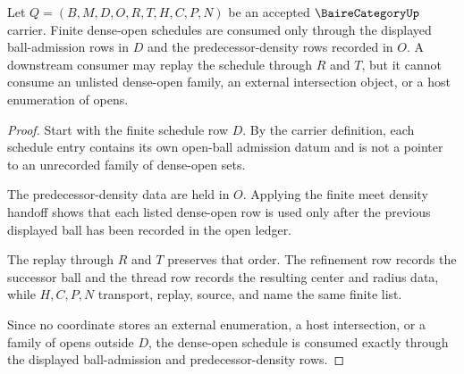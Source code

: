 \begin{theorem}
\label{thm:baire-category-dense-open-schedule-scope}
Let $Q=(B,M,D,O,R,T,H,C,P,N)$ be an accepted $\BaireCategoryUp$ carrier. Finite dense-open schedules are consumed only through the displayed ball-admission rows in $D$ and the predecessor-density rows recorded in $O$. A downstream consumer may replay the schedule through $R$ and $T$, but it cannot consume an unlisted dense-open family, an external intersection object, or a host enumeration of opens.
\end{theorem}
\begin{proof}
Start with the finite schedule row $D$. By the carrier definition, each schedule entry contains its own open-ball admission datum and is not a pointer to an unrecorded family of dense-open sets.

The predecessor-density data are held in $O$. Applying the finite meet density handoff shows that each listed dense-open row is used only after the previous displayed ball has been recorded in the open ledger.

The replay through $R$ and $T$ preserves that order. The refinement row records the successor ball and the thread row records the resulting center and radius data, while $H,C,P,N$ transport, replay, source, and name the same finite list.

Since no coordinate stores an external enumeration, a host intersection, or a family of opens outside $D$, the dense-open schedule is consumed exactly through the displayed ball-admission and predecessor-density rows.
\end{proof}


